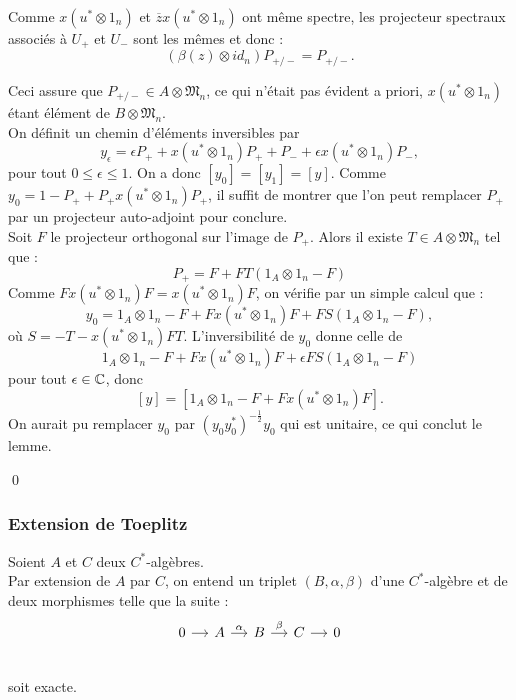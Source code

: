 \begin{dem}
Comme $x(u^*\otimes 1_n)$ et  $\overline z x(u^*\otimes 1_n)$ ont même spectre, les projecteur spectraux associés à $U_+$ et $U_-$ sont les mêmes et donc :
\[(\beta(z)\otimes id_n)P_{+/-}=P_{+/-}.\] %

Ceci assure que $P_{+/-}\in A\otimes \mathfrak M_n$, ce qui n'était pas évident a priori, $x(u^*\otimes 1_n)$ étant élément de $B\otimes\mathfrak M_n$.\\

On définit un chemin d'éléments inversibles par  
\[y_\epsilon = \epsilon P_+ + x(u^*\otimes 1_n) P_+ + P_- + \epsilon x(u^*\otimes 1_n) P_-,\]
pour tout $ 0\leq \epsilon \leq 1$.
On a donc $[y_0]=[y_1]=[y]$. Comme $y_0= 1-P_+ + P_+ x(u^*\otimes 1_n)P_+$, il suffit de montrer que l'on peut remplacer $P_+$ par un projecteur auto-adjoint pour conclure.\\

Soit $F$ le projecteur orthogonal sur l'image de $P_+$. Alors il existe $T\in A\otimes \mathfrak M_n$ tel que :
\[P_+=F + FT(1_A\otimes 1_n-F)\] %
Comme $Fx(u^*\otimes 1_n)F=x(u^*\otimes 1_n)F$, on vérifie par un simple calcul que :
\[y_0=1_A\otimes 1_n -F+Fx(u^*\otimes 1_n)F+FS(1_A\otimes 1_n-F),\]
où $S=-T-x(u^*\otimes 1_n)FT$. L'inversibilité de $y_0$ donne celle de 
\[1_A\otimes 1_n -F + F x(u^*\otimes 1_n) F +\epsilon FS (1_A\otimes 1_n-F)\]
pour tout $\epsilon \in \mathbb C$, donc 
\[[y]=[1_A\otimes 1_n -F+ F x(u^*\otimes 1_n)F].\]
On aurait pu remplacer $y_0$ par $(y_0 y_0 ^*)^{-\frac{1}{2}} y_0$ qui est unitaire, ce qui conclut le lemme.

\qed
\end{dem}

\subsubsection{Extension de Toeplitz}


Soient $A$ et $C$ deux $C^*$-algèbres. \\
Par extension de $A$ par $C$, on entend un triplet $(B,\alpha,\beta)$ d'une $C^*$-algèbre et de deux morphismes telle que la suite :
\[\begin{tikzcd}[column sep =small] 
0 \arrow{r}  & A \arrow{r}{\alpha}  &  B \arrow{r}{\beta}  & C \arrow{r}& 0 \\ 
\end{tikzcd}\]
soit exacte.\\

